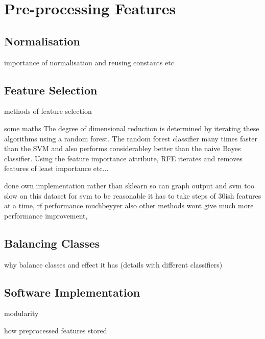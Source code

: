 \section{Pre-processing Features}
\label{sec:pl-featpreproc}

    \subsection{Normalisation}
    \label{subsec:pl-featpreproc-norm}
        \begin{sitemize}
            \item{importance of normalisation and reusing constants etc}
        \end{sitemize}

    \subsection{Feature Selection}
    \label{subsec:pl-featpreproc-sel}
        \begin{sitemize}
            \item{methods of feature selection}
            \item{some maths}
            The degree of dimensional reduction is determined by iterating these algorithms using a random forest. The random forest classifier many times faster than the SVM and also performs considerabley better than the naive Bayes classifier. Using the feature importance attribute, RFE iterates and removes features of least importance etc...
            
            done own implementation rather than sklearn so can graph output and svm too slow on this dataset
            for svm to be reasonable it has to take steps of 30ish features at a time, rf performance muchbeyyer also other methods wont give much more performance improvement, 
        \end{sitemize}
        
    
    \subsection{Balancing Classes}
    \label{subsec:pl-featpreproc-bal}
        \begin{sitemize}
            \item{why balance classes and effect it has (details with different classifiers)}
        \end{sitemize}
    
    \subsection{Software Implementation}
    \label{subsec:pl-featpreproc-software}
        \begin{sitemize}
            \item{modularity}
            \item{how preprocessed features stored}
        \end{sitemize}
    